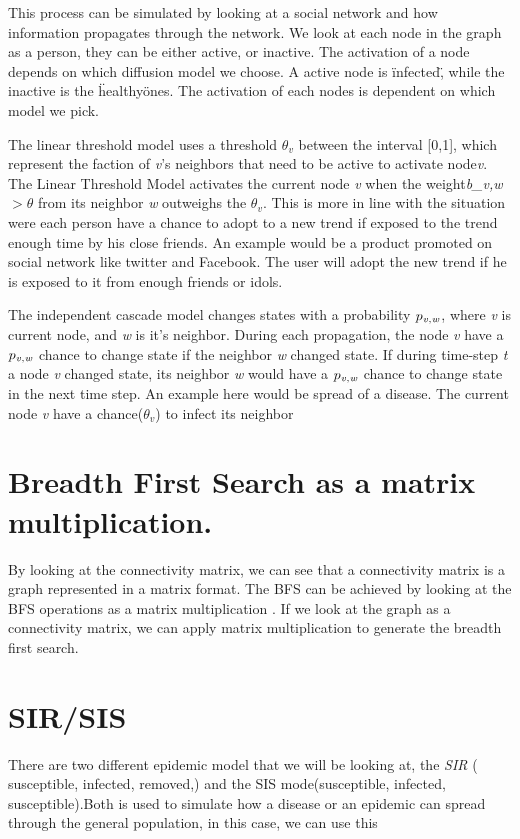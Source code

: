 This process can be simulated by looking at a social network and how information propagates through the network. We look at each node in the graph as a person, they can be either active, or inactive. The activation of a node depends on which diffusion model we choose. A active node is \"infected\", while the inactive is the \"healthy\" ones. The activation of each nodes is dependent on which model we pick.

The linear threshold model uses a threshold $\theta_v$ between the interval [0,1], which represent the faction of {\it v}'s neighbors that need to be active to activate node{\it v}. The Linear Threshold Model activates the current node {\it v} when the weight{\it b_{v,w}} $> \theta$ from its neighbor {\it w} outweighs the $\theta_v$. This is more in line with the situation were each person have a chance to adopt to a new trend if exposed to the trend enough time by his close friends. An example would be a product promoted on social network like twitter and Facebook. The user will adopt the new trend if he is exposed to it from enough friends or idols. 

The independent cascade model changes states with a probability $p_{\it v, w}$, where {\it v }is current node, and {\it w} is it's neighbor. During each propagation, the node {\it v} have a  $p_{\it v, w}$ chance to change state if the neighbor {\it w} changed state. If during time-step {\it t} a node {\it v} changed state, its neighbor {\it w} would have a  $p_{\it v, w}$ chance to change state in the next time step. An example here would be spread of a disease. The current node {\it v} have a chance($\theta_v$) to infect its neighbor

\section{Breadth First Search as a matrix multiplication.}
By looking at the 	connectivity matrix, we can see that a connectivity matrix is a graph represented in a matrix format. The BFS can be achieved by looking at the BFS operations as a matrix multiplication \cite{algoToMath}. If we look at the graph as a connectivity matrix, we can apply matrix multiplication to generate the breadth first search. 

\section{SIR/SIS}
There are two different epidemic model that we will be looking at, the {\it SIR} ( susceptible, infected, removed,) and the SIS mode(susceptible, infected, susceptible).Both is used to simulate how a disease or an epidemic can spread through the general population, in this case, we can use this 

